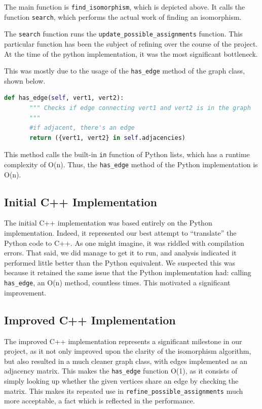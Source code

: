 \documentclass{article}
\begin{document}
  The main function is \texttt{find\_isomorphism}, which is depicted above. It calls the function \texttt{search}, which performs the actual work of finding an isomorphism.

  The \texttt{search} function runs  the \texttt{update\_possible\_assignments} function. This particular function has been the subject of refining over the course of the project. At the time of the python implementation, it was the most significant bottleneck.

  This was mostly due to the usage of the \texttt{has\_edge} method of the graph class, shown below.

  \begin{lstlisting}[language=Python,caption={Code for the \texttt{has\_edge} method of our graph class.}]
  def has_edge(self, vert1, vert2):
       """ Checks if edge connecting vert1 and vert2 is in the graph
       """
       #if adjacent, there's an edge
       return ({vert1, vert2} in self.adjacencies)

  \end{lstlisting}

  This method calls the built-in \texttt{in} function of Python lists, which has a runtime complexity of O(n).\cite{bigopy} Thus, the \texttt{has\_edge} method of the Python implementation is O(n).

  \subsection{Initial C++ Implementation}

  The initial C++ implementation was based entirely on the Python implementation. Indeed, it represented our best attempt to ``translate'' the Python code to C++. As one might imagine, it was riddled with compilation errors. That said, we did manage to get it to run, and analysis indicated it performed little better than the Python equivalent. We suspected this was because it retained the same issue that the Python implementation had: calling \texttt{has\_edge}, an O(n) method, countless times. This motivated a significant improvement.

  \subsection{Improved C++ Implementation}

  The improved C++ implementation represents a significant milestone in our project, as it not only improved upon the clarity of the isomorphism algorithm, but also resulted in a much cleaner graph class, with edges implemented as an adjacency matrix. This makes the \texttt{has\_edge} function O(1), as it consists of simply looking up whether the given vertices share an edge by checking the matrix. This makes its repeated use in \texttt{refine\_possible\_assignments} much more acceptable, a fact which is reflected in the performance.
\end{document}
